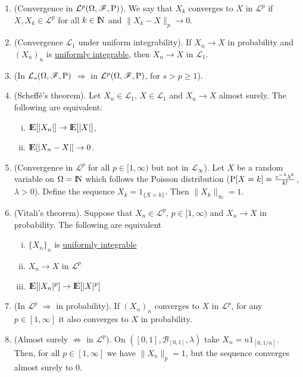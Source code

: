 \documentclass[a4paper,10pt]{scrbook}
\begin{document}
\begin{enumerate}        
 \item (Convergence in $\mathcal{L}^p(\Omega,\mathscr{F},\mathrm{P})$). We say that $X_k$ converges to $X$ in $\mathcal{L}^p$ 
       if $X,X_k\in\mathcal{L}^p$ for all $k\in\N$ and $\|X_k-X\|_p\to 0$.
 \item (Convergence $\mathcal{L}_1$ under uniform integrability). 
       If $X_n \to X$ in probability and $(X_n)_n$ is 
       \hyperlink{link:uniformly_integrable}{uniformly integrable}, then $X_n\to X$ in $\mathcal{L}_1$.
 \item (In $\mathcal{L}_s(\Omega,\mathscr{F},\mathrm{P})$ $\Rightarrow$ in $\mathcal{L}^p(\Omega,\mathscr{F},\mathrm{P})$, for $s>p\geq 1$). 
 \item (Scheff\'e's theorem). Let $X_n\in\mathcal{L}_1$, $X\in\mathcal{L}_1$ and $X_n\to X$ almost surely. The following are 
       equivalent:
       \begin{enumerate}[i.]
        \item $\E[|X_n|] \to \E[|X|]$,
        \item $\E[|X_n - X|]\to  0$.
       \end{enumerate} 
 \item (Convergence in $\mathcal{L}^p$ for all $p\in[1,\infty)$ but not in $\mathcal{L}_\infty$).
       Let $X$ be a random variable on $\Omega=\N$ which follows the Poisson distribution ($\mathrm{P}[X=k]=\frac{e^{-\lambda}\lambda^k}{k!}$, $\lambda>0$).
       Define the sequence $X_k = 1_{\{X=k\}}$. Then $\|X_k\|_\infty=1$.
 \item (Vitali's theorem).
       Suppose that $X_n\in\mathcal{L}^p$, $p\in[1,\infty)$ and $X_n\to X$ in probability.
       The following are equivalent
       \begin{enumerate}[i.]
        \item $\{X_n\}_n$ is \hyperlink{link:uniformly_integrable}{uniformly integrable}
        \item $X_n\to X$ in $\mathcal{L}^p$
        \item $\E[|X_n|^p] \to \E[|X|^p]$
       \end{enumerate}

 \item (In $\mathcal{L}^p$ $\Rightarrow$ in probability). If $(X_n)_n$ converges to $X$ in $\mathcal{L}^p$, for 
       any $p\in [1,\infty]$ it also converges to $X$ in probability. 
       
 \item (Almost surely $\not\Rightarrow$ in $\mathcal{L}^p$). On $([0,1], \mathcal{B}_{[0,1]}, \lambda)$ take $X_n=n 1_{[0,1/n]}$.
       Then, for all $p\in[1,\infty]$ we have $\|X_n\|_p=1$, but the sequence converges almost surely to $0$.
       

\end{enumerate}
\end{document}
